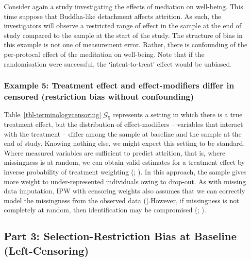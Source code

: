 \documentclass[
  single column]{article}
\begin{document}
Consider again a study investigating the effects of mediation on
well-being. This time suppose that Buddha-like detachment affects
attrition. As such, the investigators will observe a restricted range of
effect in the sample at the end of study compared to the sample at the
start of the study. The structure of bias in this example is not one of
measurement error. Rather, there is confounding of the per-protocal
effect of the meditation on well-being. Note that if the randomisation
were successful, the `intent-to-treat' effect would be unbiased.

\subsubsection{Example 5: Treatment effect and effect-modifiers differ
in censored (restriction bias without
confounding)}\label{example-5-treatment-effect-and-effect-modifiers-differ-in-censored-restriction-bias-without-confounding}

Table~\ref{tbl-terminologycensoring} \(\mathcal{G}_5\) represents a
setting in which there is a true treatment effect, but the distribution
of effect-modifiers -- variables that interact with the treatment --
differ among the sample at baseline and the sample at the end of study.
Knowing nothing else, we might expect this setting to be standard. Where
measured variables are sufficient to predict attrition, that is, where
missingness is at random, we can obtain valid estimates for a treatment
effect by inverse probability of treatment weighting
(;
). In this approach,
the sample gives more weight to under-represented individuals owing to
drop-out. As with missing data imputation, IPW with censoring weights
also assumes that we can correctly model the missingness from the
observed data ().However, if missingness is not completely at random, then
identification may be compromised
(;
).

\newpage{}

\subsection{Part 3: Selection-Restriction Bias at Baseline
(Left-Censoring)}\label{part-3-selection-restriction-bias-at-baseline-left-censoring}
\end{document}

